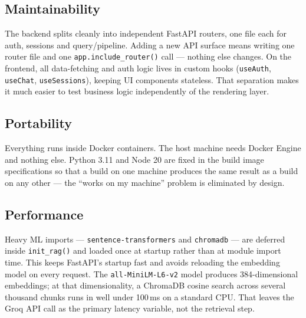 \subsection{Maintainability}

The backend splits cleanly into independent FastAPI routers, one file each for auth,
sessions and query/pipeline. Adding a new API surface means writing one router file and
one \texttt{app.include\_router()} call --- nothing else changes. On the frontend, all
data-fetching and auth logic lives in custom hooks (\texttt{useAuth}, \texttt{useChat},
\texttt{useSessions}), keeping UI components stateless. That separation makes it
much easier to test business logic independently of the rendering layer.

\subsection{Portability}

Everything runs inside Docker containers. The host machine needs Docker Engine and nothing
else. Python 3.11 and Node 20 are fixed in the build image specifications so that a build
on one machine produces the same result as a build on any other --- the
``works on my machine'' problem is eliminated by design.

\subsection{Performance}

Heavy ML imports --- \texttt{sentence-transformers} and \texttt{chromadb} --- are deferred
inside \texttt{init\_rag()} and loaded once at startup rather than at module import time.
This keeps FastAPI's startup fast and avoids reloading the embedding model on every
request. The \texttt{all-MiniLM-L6-v2} model produces 384-dimensional embeddings; at that
dimensionality, a ChromaDB cosine search across several thousand chunks runs in well under
100\,ms on a standard CPU. That leaves the Groq API call as the primary latency variable,
not the retrieval step.

